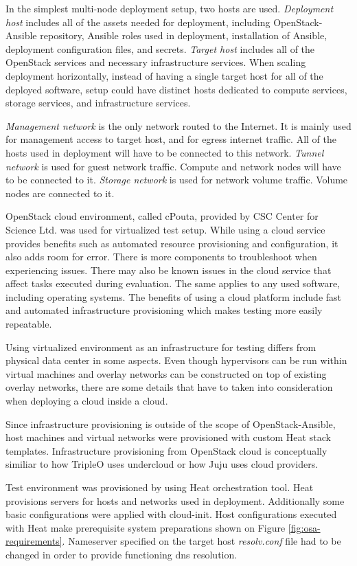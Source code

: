 In the simplest multi-node deployment setup, two hosts are used.
\textit{Deployment host} includes all of the assets needed for deployment,
including OpenStack-Ansible repository, Ansible roles used in deployment,
installation of Ansible, deployment configuration files, and secrets.
\textit{Target host} includes all of the OpenStack services and necessary
infrastructure services. When scaling deployment horizontally, instead of
having a single target host for all of the deployed software, setup could have
distinct hosts dedicated to compute services, storage services, and
infrastructure services.

\textit{Management network} is the only network routed to the Internet. It is
mainly used for management access to target host, and for egress internet
traffic. All of the hosts used in deployment will have to be connected to this
network. \textit{Tunnel network} is used for guest network traffic. Compute and
network nodes will have to be connected to it. \textit{Storage network} is used
for network volume traffic. Volume nodes are connected to it.

OpenStack cloud environment, called cPouta, provided by CSC Center for Science
Ltd. was used for virtualized test setup. While using a cloud service provides
benefits such as automated resource provisioning and configuration, it also
adds room for error. There is more components to troubleshoot when experiencing
issues. There may also be known issues in the cloud service that affect tasks
executed during evaluation. The same applies to any used software, including
operating systems. The benefits of using a cloud platform include fast and
automated infrastructure provisioning which makes testing more easily
repeatable.

Using virtualized environment as an infrastructure for testing differs from
physical data center in some aspects. Even though hypervisors can be run within
virtual machines and overlay networks can be constructed on top of existing
overlay networks, there are some details that have to taken into consideration
when deploying a cloud inside a cloud.

Since infrastructure provisioning is outside of the scope of OpenStack-Ansible,
host machines and virtual networks were provisioned with custom Heat stack
templates. Infrastructure provisioning from OpenStack cloud is conceptually
similiar to how TripleO uses undercloud or how Juju uses cloud providers.

Test environment was provisioned by using Heat orchestration tool. Heat
provisions servers for hosts and networks used in deployment. Additionally some
basic configurations were applied with cloud-init. Host configurations executed
with Heat make prerequisite system preparations shown on Figure
\ref{fig:osa-requirements}. Nameserver specified on the target host
\textit{resolv.conf} file had to be changed in order to provide functioning dns
resolution.

